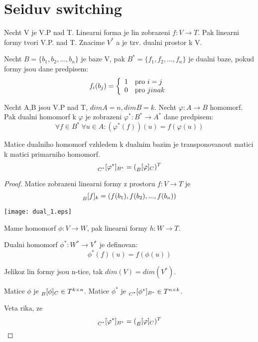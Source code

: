 \section{\texorpdfstring{Seiduv switching}{Seiduv switching}}

\vspace{5mm}
\large


\begin{definition}
Necht V je V.P nad T. Linearni forma je lin zobrazeni $f:V \to T$. Pak linearni formy tvori V.P. nad T. Znacime $V^{\ast}$ a je tzv. dualni prostor k V.
\end{definition}
\begin{definition}
Necht $B = \{b_1, b_2, ..., b_n\}$ je baze V, pak $B^{\ast} = \{ f_1, f_2, ..., f_n \}$ je dualni baze, pokud formy jsou dane predpisem:
\[ f_i(b_j)= \left\{ \begin{array}{ll} 1 & \mbox{pro } i = j \\ 0 & \mbox{pro } jinak \end{array} \right. \]
\end{definition}
\begin{definition}
Necht A,B jsou V.P nad T, $dimA = n, dimB = k$. Necht $\varphi:A \to B$ homomorf. Pak dualni homomorf k $\varphi$ je zobrazeni $\varphi^{\ast}: B^{\ast} \to A^{\ast}$ dane predpisem:
\[ \forall f \in B^{\ast}\  \forall u \in A: (\varphi^{\ast}(f))(u) = f(\varphi(u)) \]
\end{definition}


\begin{theorem}
Matice dualniho homomorf vzhledem k dualnim bazim je transponovanout matici k matici primarniho homomorf.
\[ \prescript{}{C^{\ast}}{[\varphi^{\ast}]}_{B^{\ast}} = (\prescript{}{B}{[\varphi]}_{C})^T \]
\end{theorem}
\begin{proof}
	Matice zobrazeni linearni formy z prostoru $f:V \to T$ je
	\[ \prescript{}{B}{[f]}_{k} = (f(b_1), f(b_2),...,f(b_n)) \]

	\texttt{[image: dual\_1.eps]}

	Mame homomorf $\phi:V \to W$, pak linearni formy $h:W \to T$.

	Dualni homomorf $\phi^{\ast}:W^{\ast} \to V^{\ast}$ je definovan:
	\[ \phi^{\ast}(f)(u) = f(\phi(u)) \]

	Jelikoz lin formy jsou n-tice, tak $dim(V) = dim(V^{\ast})$.

	Matice $\phi$ je $\prescript{}{B}{[\phi]}_{C} \in T^{k \times n}$.
	Matice $\phi^{\ast}$ je $\prescript{}{C^{\ast}}{[\phi^{\ast}]}_{B^{\ast}} \in T^{n \times k}$.

	Veta rika, ze
	\[ \prescript{}{C^{\ast}}{[\varphi^{\ast}]}_{B^{\ast}} = (\prescript{}{B}{[\varphi]}_{C})^T \]
\end{proof}


